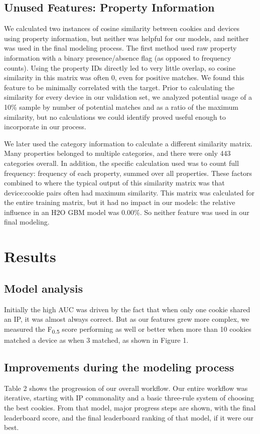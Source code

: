 \documentclass[9pt, journal]{IEEEtran}
\begin{document}
\subsection{Unused Features: Property Information}
We calculated two instances of cosine similarity between cookies and devices using property information, but neither was helpful for our models, and neither was used in the final modeling process.
The first method used raw property information with a binary presence/absence flag (as opposed to frequency counts).
Using the property IDs directly led to very little overlap, so cosine similarity in this matrix was often 0, even for positive matches. We found this feature to be minimally correlated with the target.
Prior to calculating the similarity for every device in our validation set, we analyzed potential usage of a 10\% sample by number of potential matches and as a ratio of the maximum similarity, but no calculations we could identify proved useful enough to incorporate in our process.

We later used the category information to calculate a different similarity matrix. 
Many properties belonged to multiple categories, and there were only 443 categories overall.
In addition, the specific calculation used was to count full frequency: frequency of each property, summed over all properties.
These factors combined to where the typical output of this similarity matrix was that device:cookie pairs often had maximum similarity. 
This matrix was calculated for the entire training matrix, but it had no impact in our models: the relative influence in an H2O GBM model was 0.00\%.
So neither feature was used in our final modeling.

\section{Results}
\subsection{Model analysis}
Initially the high AUC was driven by the fact that when only one cookie shared an IP, it was almost always correct. 
But as our features grew more complex, we measured the  F\textsubscript{0.5}  score performing as well or better when more than 10 cookies matched a device as when 3 matched, as shown in Figure 1.


\subsection{Improvements during the modeling process}
Table 2 shows the progression of our overall workflow. Our entire workflow was iterative, starting with IP commonality and a basic three-rule system of choosing the best cookies. From that model, major progress steps are shown, with the final leaderboard score, and the final leaderboard ranking of that model, if it were our best.
\end{document}
